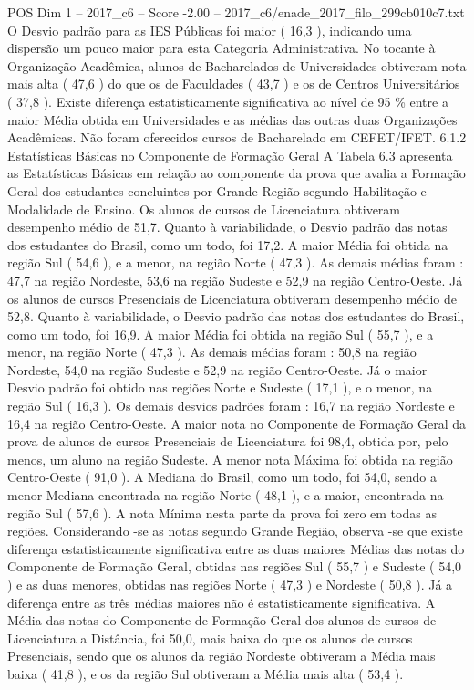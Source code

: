 \begin{textsample}{POS Dim 1 – 2017\_c6 – Score -2.00 – 2017\_c6/enade\_2017\_filo\_299cb010c7.txt}
O Desvio padrão para as IES Públicas foi maior ( 16,3 ), indicando uma dispersão um pouco maior para esta Categoria Administrativa.
No tocante à Organização Acadêmica, alunos de Bacharelados de Universidades obtiveram nota mais alta ( 47,6 ) do que os de Faculdades ( 43,7 ) e os de Centros Universitários ( 37,8 ).
Existe diferença estatisticamente significativa ao nível de 95 \% entre a maior Média obtida em Universidades e as médias das outras duas Organizações Acadêmicas.
Não foram oferecidos cursos de Bacharelado em CEFET/IFET. 6.1.2 Estatísticas Básicas no Componente de Formação Geral A Tabela 6.3 apresenta as Estatísticas Básicas em relação ao componente da prova que avalia a Formação Geral dos estudantes concluintes por Grande Região segundo Habilitação e Modalidade de Ensino.
Os alunos de cursos de Licenciatura obtiveram desempenho médio de 51,7.
Quanto à variabilidade, o Desvio padrão das notas dos estudantes do Brasil, como um todo, foi 17,2.
A maior Média foi obtida na região Sul ( 54,6 ), e a menor, na região Norte ( 47,3 ).
As demais médias foram : 47,7 na região Nordeste, 53,6 na região Sudeste e 52,9 na região Centro-Oeste.
Já os alunos de cursos Presenciais de Licenciatura obtiveram desempenho médio de 52,8.
Quanto à variabilidade, o Desvio padrão das notas dos estudantes do Brasil, como um todo, foi 16,9.
A maior Média foi obtida na região Sul ( 55,7 ), e a menor, na região Norte ( 47,3 ).
As demais médias foram : 50,8 na região Nordeste, 54,0 na região Sudeste e 52,9 na região Centro-Oeste.
Já o maior Desvio padrão foi obtido nas regiões Norte e Sudeste ( 17,1 ), e o menor, na região Sul ( 16,3 ).
Os demais desvios padrões foram : 16,7 na região Nordeste e 16,4 na região Centro-Oeste.
A maior nota no Componente de Formação Geral da prova de alunos de cursos Presenciais de Licenciatura foi 98,4, obtida por, pelo menos, um aluno na região Sudeste.
A menor nota Máxima foi obtida na região Centro-Oeste ( 91,0 ).
A Mediana do Brasil, como um todo, foi 54,0, sendo a menor Mediana encontrada na região Norte ( 48,1 ), e a maior, encontrada na região Sul ( 57,6 ).
A nota Mínima nesta parte da prova foi zero em todas as regiões.
Considerando -se as notas segundo Grande Região, observa -se que existe diferença estatisticamente significativa entre as duas maiores Médias das notas do Componente de Formação Geral, obtidas nas regiões Sul ( 55,7 ) e Sudeste ( 54,0 ) e as duas menores, obtidas nas regiões Norte ( 47,3 ) e Nordeste ( 50,8 ).
Já a diferença entre as três médias maiores não é estatisticamente significativa.
A Média das notas do Componente de Formação Geral dos alunos de cursos de Licenciatura a Distância, foi 50,0, mais baixa do que os alunos de cursos Presenciais, sendo que os alunos da região Nordeste obtiveram a Média mais baixa ( 41,8 ), e os da região Sul obtiveram a Média mais alta ( 53,4 ).

\end{textsample}
